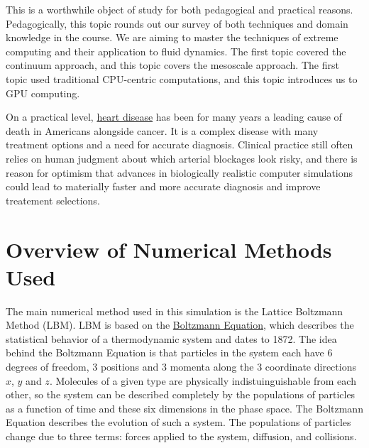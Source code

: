 \documentclass[11pt]{article} %
\begin{document}
This is a worthwhile object of study for both pedagogical and practical reasons.
Pedagogically, this topic rounds out our survey of both techniques and domain knowledge in the course.
We are aiming to master the techniques of extreme computing and their application to fluid dynamics.
The first topic covered the continuum approach, and this topic covers the mesoscale approach.
The first topic used traditional CPU-centric computations, and this topic introduces us to GPU computing.

On a practical level, \href{https://www.cdc.gov/heartdisease/facts.htm}{heart disease} 
has been for many years a leading cause of death in Americans alongside cancer.
It is a complex disease with many treatment options and a need for accurate diagnosis.
Clinical practice still often relies on human judgment about which arterial blockages 
look risky, and there is reason for optimism that advances in biologically realistic computer
simulations could lead to materially faster and more accurate diagnosis 
and improve treatement selections.

\newpage
\section{Overview of Numerical Methods Used}
The main numerical method used in this simulation is the Lattice Boltzmann Method (LBM).
LBM is based on the \href{https://en.wikipedia.org/wiki/Boltzmann_equation}{Boltzmann Equation},
which describes the statistical behavior of a thermodynamic system and dates to 1872.
The idea behind the Boltzmann Equation is that particles in the system each have 6 degrees
of freedom, 3 positions and 3 momenta along the 3 coordinate directions $x$, $y$ and $z$.
Molecules of a given type are physically indistuinguishable from each other,
so the system can be described completely by the populations of particles as a function
of time and these six dimensions in the phase space.
The Boltzmann Equation describes the evolution of such a system.
The populations of particles change due to three terms: 
forces applied to the system, diffusion, and collisions.
\end{document}
